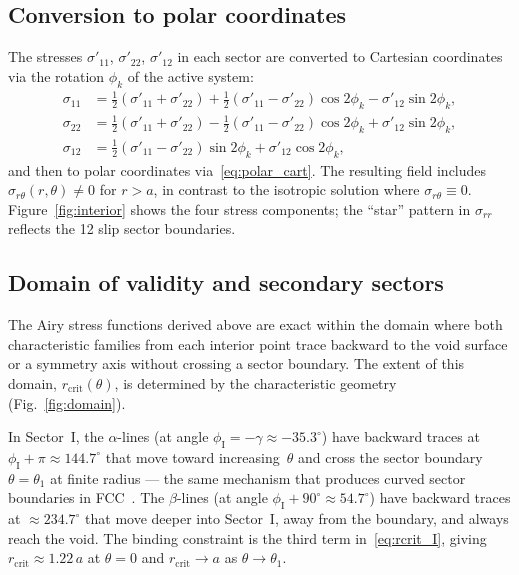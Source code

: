 \documentclass{svjour3} %
\newcommand{\srr}{\sigma_{rr}}
\newcommand{\srt}{\sigma_{r\theta}}
\begin{document}
\subsection{Conversion to polar coordinates}

The stresses $\sigma'_{11}$, $\sigma'_{22}$, $\sigma'_{12}$ in each
sector are converted to Cartesian coordinates via the rotation
$\phi_k$ of the active system:
\begin{align}
\sigma_{11} &= \tfrac{1}{2}(\sigma'_{11} + \sigma'_{22})
  + \tfrac{1}{2}(\sigma'_{11} - \sigma'_{22})\cos 2\phi_k
  - \sigma'_{12}\sin 2\phi_k, \\
\sigma_{22} &= \tfrac{1}{2}(\sigma'_{11} + \sigma'_{22})
  - \tfrac{1}{2}(\sigma'_{11} - \sigma'_{22})\cos 2\phi_k
  + \sigma'_{12}\sin 2\phi_k, \\
\sigma_{12} &= \tfrac{1}{2}(\sigma'_{11} - \sigma'_{22})\sin 2\phi_k
  + \sigma'_{12}\cos 2\phi_k,
\end{align}
and then to polar coordinates via~\eqref{eq:polar_cart}. The resulting
field includes $\srt(r, \theta) \neq 0$ for $r > a$, in contrast to
the isotropic solution where $\srt \equiv 0$.
Figure~\ref{fig:interior} shows the four stress components; the
``star'' pattern in $\srr$ reflects the 12 slip sector boundaries.

\subsection{Domain of validity and secondary sectors}
\label{sec:domain_validity}

The Airy stress functions derived above are exact within the domain
where both characteristic families from each interior point trace
backward to the void surface or a symmetry axis without crossing a
sector boundary. The extent of this domain,
$r_{\mathrm{crit}}(\theta)$, is determined by the characteristic
geometry (Fig.~\ref{fig:domain}).

In Sector~I, the $\alpha$-lines (at angle
$\phi_{\mathrm{I}} = -\gamma \approx -35.3^\circ$) have backward
traces at $\phi_{\mathrm{I}} + \pi \approx 144.7^\circ$ that move
toward increasing~$\theta$ and cross the sector boundary
$\theta = \theta_1$ at finite radius --- the same mechanism that
produces curved sector boundaries in
FCC~\citep[Section~3.8]{kysar2005}. The $\beta$-lines (at angle
$\phi_{\mathrm{I}} + 90^\circ \approx 54.7^\circ$) have backward
traces at $\approx 234.7^\circ$ that move deeper into Sector~I, away
from the boundary, and always reach the void. The binding constraint
is the third term in~\eqref{eq:rcrit_I}, giving
$r_{\mathrm{crit}} \approx 1.22\,a$ at $\theta = 0$ and
$r_{\mathrm{crit}} \to a$ as $\theta \to \theta_1$.
\end{document}

